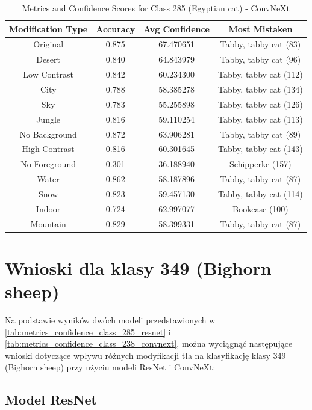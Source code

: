 \begin{table}
	\centering
	\begin{tabular}{|c|c|c|c|}
		\hline
		\textbf{Modification Type} & \textbf{Accuracy} & \textbf{Avg Confidence} & \textbf{Most Mistaken} \\
		\hline
		Original & 0.875 & 67.470651 & Tabby, tabby cat (83) \\
		\hline
		Desert & 0.840 & 64.843979 & Tabby, tabby cat (96) \\
		\hline
		Low Contrast & 0.842 & 60.234300 & Tabby, tabby cat (112) \\
		\hline
		City & 0.788 & 58.385278 & Tabby, tabby cat (134) \\
		\hline
		Sky & 0.783 & 55.255898 & Tabby, tabby cat (126) \\
		\hline
		Jungle & 0.816 & 59.110254 & Tabby, tabby cat (113) \\
		\hline
		No Background & 0.872 & 63.906281 & Tabby, tabby cat (89) \\
		\hline
		High Contrast & 0.816 & 60.301645 & Tabby, tabby cat (143) \\
		\hline
		No Foreground & 0.301 & 36.188940 & Schipperke (157) \\
		\hline
		Water & 0.862 & 58.187896 & Tabby, tabby cat (87) \\
		\hline
		Snow & 0.823 & 59.457130 & Tabby, tabby cat (114) \\
		\hline
		Indoor & 0.724 & 62.997077 & Bookcase (100) \\
		\hline
		Mountain & 0.829 & 58.399331 & Tabby, tabby cat (87) \\
		\hline
	\end{tabular}
	\caption{Metrics and Confidence Scores for Class 285 (Egyptian cat) - ConvNeXt}
	\label{tab:metrics_confidence_class_285_convnext}
\end{table}

\section*{Wnioski dla klasy 349 (Bighorn sheep)}

Na podstawie wyników dwóch modeli przedstawionych w \ref*{tab:metrics_confidence_class_285_resnet} i \ref*{tab:metrics_confidence_class_238_convnext}, można wyciągnąć następujące wnioski dotyczące wpływu różnych 
modyfikacji tła na klasyfikację klasy 349 (Bighorn sheep) przy użyciu modeli ResNet i ConvNeXt:

\subsection*{Model ResNet}

